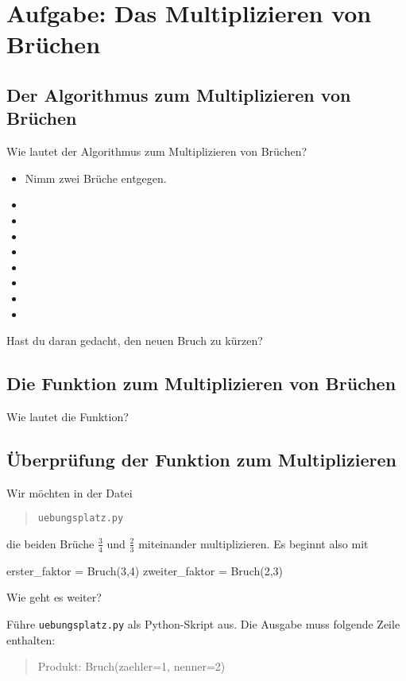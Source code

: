 \section{Aufgabe: Das Multiplizieren von Brüchen}

\subsection*{Der Algorithmus zum Multiplizieren von Brüchen}

Wie lautet der Algorithmus zum Multiplizieren von Brüchen?

\begin{itemize}[itemsep=2ex]
	\item Nimm zwei Brüche entgegen.
	\item 
	\item 
	\item 
	\item 
	\item 
	\item  
	\item 
	\item 
\end{itemize}

Hast du daran gedacht, den neuen Bruch zu kürzen?

\subsection*{Die Funktion zum Multiplizieren von Brüchen}

Wie lautet die Funktion?

\subsection*{Überprüfung der Funktion zum Multiplizieren}

Wir möchten in der Datei
\begin{quote}
	\texttt{uebungsplatz.py}
\end{quote}
die beiden Brüche $\frac{3}{4}$ und $\frac{2}{3}$ miteinander multiplizieren. Es beginnt also mit

\begin{codePython}
erster_faktor = Bruch(3,4)
zweiter_faktor = Bruch(2,3)
\end{codePython}

Wie geht es weiter?

Führe \texttt{uebungsplatz.py} als Python-Skript aus. Die Ausgabe muss folgende Zeile enthalten:
\begin{quote}
	Produkt: Bruch(zaehler=1, nenner=2)
\end{quote}